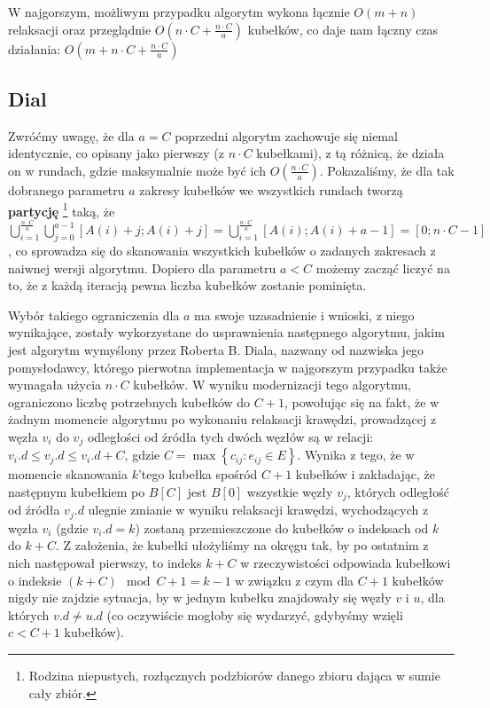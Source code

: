W najgorszym, możliwym przypadku algorytm wykona łącznie $ O \left( m + n \right)$ relaksacji oraz przeglądnie $ O \left( n \cdot C + \frac{n \cdot C }{a} \right) $ kubełków, co daje nam łączny czas działania: $ O \left( m + n \cdot C + \frac{n \cdot C }{a} \right) $

\subsection{Dial}

Zwróćmy uwagę, że dla $a=C$ poprzedni algorytm zachowuje się niemal identycznie, co opisany jako pierwszy (z $n \cdot C$ kubełkami), z tą różnicą, że działa on w rundach, gdzie maksymalnie może być ich $ O \left( \frac{n \cdot C}{a} \right) $. Pokazaliśmy, że dla tak dobranego parametru $a$ zakresy kubełków we wszystkich rundach tworzą \textbf{partycję} \footnote{Rodzina niepustych, rozłącznych podzbiorów danego zbioru dająca w sumie cały zbiór.} taką, że $\bigcup _{i=1}^{\frac{n \cdot C}{a}} \bigcup _{j=0}^{a-1} \left[ A \left( i \right ) + j ; A \left( i \right ) + j \right ] = \bigcup _{i=1}^{\frac{n \cdot C}{a}} \left[ A \left( i \right ) ; A \left( i \right ) + a - 1 \right ] = \left[ 0 ; n \cdot C - 1 \right ]$, co sprowadza się do skanowania wszystkich kubełków o zadanych zakresach z naiwnej wersji algorytmu. Dopiero dla parametru $a < C$ możemy zacząć liczyć na to, że z każdą iteracją pewna liczba kubełków zostanie pominięta. 

Wybór takiego ograniczenia dla $a$ ma swoje uzasadnienie i wnioski, z niego wynikające, zostały wykorzystane do usprawnienia następnego algorytmu, jakim jest algorytm wymyślony przez Roberta B. Diala, nazwany od nazwiska jego pomysłodawcy, którego pierwotna implementacja w najgorszym przypadku także wymagała użycia $n \cdot C$ kubełków. W wyniku modernizacji tego algorytmu, ograniczono liczbę potrzebnych kubełków do $C+1$, powołując się na fakt, że w żadnym momencie algorytmu po wykonaniu relaksacji krawędzi, prowadzącej z węzła $v_{i}$ do $v_{j}$ odległości od źródła tych dwóch węzłów są w relacji: $v_{i}.d \leqslant v_{j}.d \leqslant v_{i}.d + C$, gdzie $C = \max \left\{ c_{ij} : e_{ij} \in E \right\}$. Wynika z tego, że w momencie skanowania $k$'tego kubełka spośród $C + 1$ kubełków i zakładając, że następnym kubełkiem po $B \left[ C \right] $ jest $B \left[ 0 \right] $ wszystkie węzły $v_{j}$, których odległość od źródła $v_{j}.d$ ulegnie zmianie w wyniku relaksacji krawędzi, wychodzących z węzła $v_{i}$ (gdzie $v_{i}.d = k$) zostaną przemieszczone do kubełków o indeksach od $k$ do $k + C$. Z założenia, że kubełki ułożyliśmy na okręgu tak, by po ostatnim z nich następował pierwszy, to indeks $k + C$ w rzeczywistości odpowiada kubełkowi o indeksie $ \left( k + C \right) \mod{C+1} = k - 1$ w związku z czym dla $C+1$ kubełków nigdy nie zajdzie sytuacja, by w jednym kubełku znajdowały się węzły $v$ i $u$, dla których $v.d \neq u.d$ (co oczywiście mogłoby się wydarzyć, gdybyśmy wzięli $c < C + 1$ kubełków).

